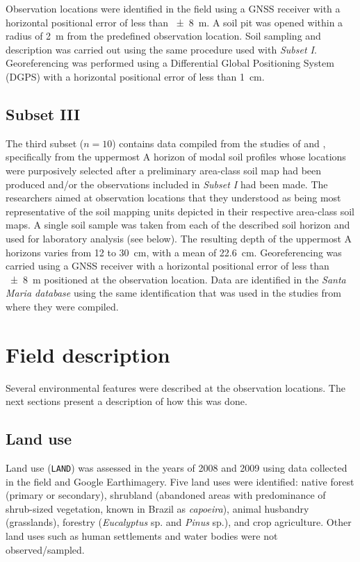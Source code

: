 Observation locations were identified in the field using a GNSS receiver with a horizontal positional error
of less than \SI{\pm8}{\metre}. A soil pit was opened within a radius of \SI{2}{\metre} from the predefined 
observation location. Soil sampling and description was carried out using the same procedure used with 
\emph{Subset I}. Georeferencing was performed using a Differential Global Positioning System (DGPS) with 
a horizontal positional error of less than \SI{1}{\centi\metre}.

\tocless\subsection{Subset III}

The third subset ($n = 10$) contains data compiled from the studies of  and
, specifically from the uppermost A horizon of modal soil profiles whose locations 
were purposively selected after a preliminary area-class soil map had been produced and/or the observations
included in \emph{Subset I} had been made. The researchers aimed at observation locations that they 
understood as being most representative of the soil mapping units depicted in their respective area-class 
soil maps. A single soil sample was taken from each of the described soil horizon and used for laboratory 
analysis (see below). The resulting depth of the uppermost A horizons varies from \num{12} to 
\SI{30}{\centi\metre}, with a mean of \SI{22.6}{\centi\metre}. Georeferencing was carried using a GNSS 
receiver with a horizontal positional error of less than \SI{\pm8}{\metre} positioned at the observation 
location. Data are identified in the \emph{Santa Maria database} using the same identification that was 
used in the studies from where they were compiled.

\tocless\section{Field description}

Several environmental features were described at the observation locations. The next sections 
present a description of how this was done.

\tocless\subsection{Land use}

Land use (\texttt{LAND}) was assessed in the years of \num{2008} and \num{2009} using data 
collected in the field and Google Earth\textregistered imagery. Five land uses were identified: 
native forest (primary or secondary), shrubland (abandoned areas with predominance of shrub-sized 
vegetation, known in Brazil as \emph{capoeira}), animal husbandry (grasslands), forestry 
(\textit{Eucalyptus} sp. and \textit{Pinus} sp.), and crop agriculture. Other land uses such as 
human settlements and water bodies were not observed/sampled.

